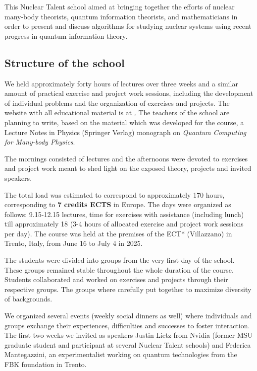 \documentclass[prc,amsart,english]{revtex4-2}
\begin{document}
This Nuclear Talent school aimed at bringing together
the efforts of nuclear many-body theorists, quantum information
theorists, and mathematicians in order to present and discuss
algorithms for studying nuclear systems using recent progress in
quantum information theory.


\subsection{Structure of the school}

We held approximately forty hours of lectures over three weeks and a
similar amount of practical exercise and project work sessions, including the
development of individual problems and the organization of exercises and projects.
The website with all educational material is at \href{https://github.com/NuclearTalent/TalentQuantumComputingECT2025}. 
The teachers of the school are planning to write, based on the material which was developed for the course, a Lecture Notes in Physics (Springer Verlag) monograph on \textit{Quantum Computing for Many-body Physics}. 


The mornings consisted of lectures and the
afternoons were  devoted to exercises and project work meant to shed light on the exposed theory, 
projects  and invited speakers.

The total load was estimated to correspond to approximately 170 hours, corresponding to  {\bf 7 credits ECTS} in Europe.
The days were organized as follows: 9.15-12.15 lectures, time for exercises with assistance (including lunch)
till approximately 18 (3-4 hours of allocated exercise and project work sessions per day).
The course was held at the premises of the  ECT* (Villazzano) in Trento, Italy, from
June 16 to July 4 in 2025.

The students were divided into  groups from the very first day of the school. These groups remained stable throughout the whole duration of the course. Students collaborated and worked on exercises and projects through their respective groups. The groups where carefully put together to maximize diversity of backgrounds. 

We organized several events (weekly social dinners as well) where individuals and groups exchange their experiences, difficulties and successes to foster interaction.  The first two weeks we invited as speakers Justin Lietz from Nvidia (former MSU graduate student and participant at several Nuclear Talent schools) and Federica Mantegazzini, an experimentalist working on quantum technologies  from the FBK foundation in Trento.
\end{document}
